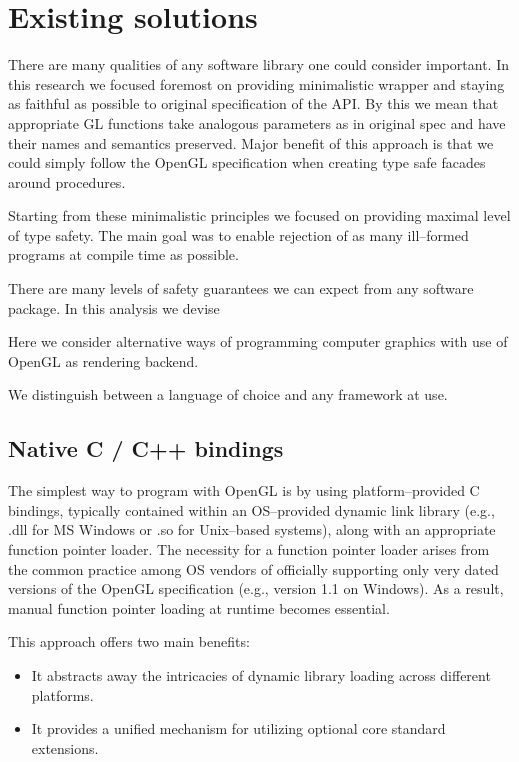 \chapter{Existing solutions}

There are many qualities of any software library one could consider important.
In this research we focused foremost on providing minimalistic wrapper and staying as faithful as possible to original specification of the API.
By this we mean that appropriate GL functions take analogous parameters as in original spec and have their names and semantics preserved.
Major benefit of this approach is that we could simply follow the OpenGL specification when creating type safe facades around procedures.

Starting from these minimalistic principles we focused on providing maximal level of type safety. The main goal was to enable rejection of as many ill--formed programs at compile time as possible.

There are many levels of safety guarantees we can expect from any software package.
In this analysis we devise 

Here we consider alternative ways of programming computer graphics with use of OpenGL as rendering backend.

We distinguish between a language of choice and any framework at use. 

\section{Native C / C++ bindings}

The simplest way to program with OpenGL is by using platform--provided C bindings, 
typically contained within an OS--provided dynamic link library (e.g., .dll for MS Windows or .so for Unix--based systems), 
along with an appropriate function pointer loader.
The necessity for a function pointer loader arises from the common practice among OS vendors of officially supporting only very dated versions of the OpenGL specification 
(e.g., version 1.1 on Windows). As a result, manual function pointer loading at runtime becomes essential. 

This approach offers two main benefits:
\begin{itemize}
    \item It abstracts away the intricacies of dynamic library loading across different platforms.
    \item It provides a unified mechanism for utilizing optional core standard extensions.
\end{itemize}

